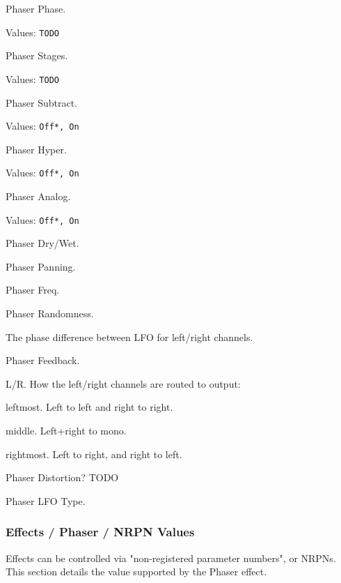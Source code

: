    Phaser Phase.

   Values: \texttt{TODO}

   Phaser Stages.

   Values: \texttt{TODO}

   Phaser Subtract.

   Values: \texttt{Off*, On}

   Phaser Hyper.

   Values: \texttt{Off*, On}

   Phaser Analog.

   Values: \texttt{Off*, On}

   Phaser Dry/Wet.

   Phaser Panning.

   Phaser Freq.

   Phaser Randomness.

   The phase difference between LFO for left/right channels.

   Phaser Feedback.

   L/R. How the left/right channels are routed to output:

      \begin{enumber}
         \item leftmost. Left to left and right to right.
         \item middle. Left+right to mono.
         \item rightmost. Left to right, and right to left.
      \end{enumber}

   Phaser Distortion? TODO

   Phaser LFO Type.

\subsubsection{Effects / Phaser / NRPN Values}
\label{subsubsec:effects_edit_phaser_nrpn}

Effects can be controlled via "non-registered parameter numbers", or NRPNs.
This section details the value supported by the Phaser effect.

